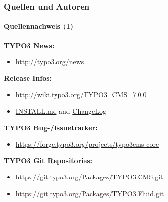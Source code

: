 \begin{frame}[fragile]
	\frametitle{Quellen und Autoren}
	\framesubtitle{Quellennachweis (1)}

	\textbf{TYPO3 News:}
		\begin{itemize}\smaller
			\item \url{http://typo3.org/news}
		\end{itemize}

	\textbf{Release Infos:}
		\begin{itemize}\smaller
			\item \url{http://wiki.typo3.org/TYPO3_CMS_7.0.0}
			\item \href{https://github.com/TYPO3/TYPO3.CMS/blob/master/INSTALL.md}{INSTALL.md} and \href{https://github.com/TYPO3/TYPO3.CMS/blob/master/ChangeLog}{ChangeLog}
		\end{itemize}

	\textbf{TYPO3 Bug-/Issuetracker:}
		\begin{itemize}\smaller
			\item \url{https://forge.typo3.org/projects/typo3cms-core}
		\end{itemize}

	\textbf{TYPO3 Git Repositories:}
		\begin{itemize}\smaller
			\item \url{https://git.typo3.org/Packages/TYPO3.CMS.git}
			\item \url{https://git.typo3.org/Packages/TYPO3.Fluid.git}
		\end{itemize}

\end{frame}


